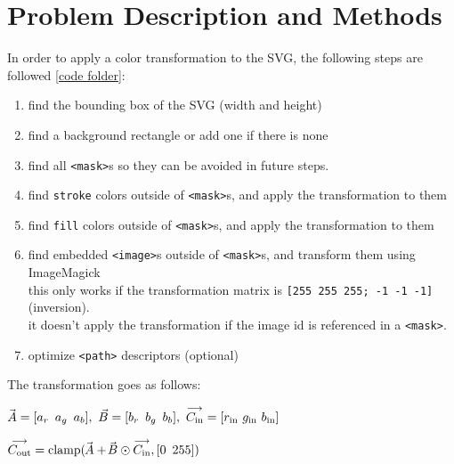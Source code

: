 \documentclass[12pt]{article}
\newcommand \hpx [1]{\hspace{#1px}}
\newcommand \nhpx [1]{\hspace{-#1px}}
\newcommand \Avec {\!\nhpx{-0.5}\vec{\hpx{0.5}A}}
\newcommand \Bvec {\nhpx{1.5}\vec{\hpx{0.3}B}}
\begin{document}
\section{Problem Description and Methods}

In order to apply a color transformation to the SVG, the following steps are followed
\ref{code folder}:
\begin{enumerate}
	\item \vspace{-0.3em} find the bounding box of the SVG (width and height)
	\item \vspace{-0.42em} find a background rectangle or add one if there is none
	\item \vspace{-0.42em} find all \texttt{<mask>}s so they can be avoided in
		future steps.
	\item \vspace{-0.42em} find {\tt stroke} colors outside of {\tt <mask>}s,
		and apply the transformation to them
	\item \vspace{-0.42em} find {\tt fill} colors outside of {\tt <mask>}s,
		and apply the transformation to them
	\item \vspace{-0.42em} find embedded {\tt <image>}s outside of {\tt <mask>}s,
		and transform them using ImageMagick\\
		this only works if the transformation matrix is {\tt [255 255 255; -1 -1 -1]}
		(inversion).\\
		it doesn't apply the transformation if the image id is referenced in a
		{\tt <mask>}.
	\item \vspace{-0.42em} optimize {\tt <path>} descriptors (optional)
\end{enumerate}

\pagebreak\restoregeometry

\noindent The transformation goes as follows:

$\Avec = [a_r ~\, a_g ~\, a_b],~\vec B = [b_r ~\, b_g ~\, b_b],~\overset{
\text{\raisebox{-0.5px}{$\longrightarrow$}}}{C_{\text{in}}} = [r_{\text{in}}
~ g_{\text{in}} ~ b_{\text{in}}]$

$\overset{\text{\raisebox{-0.5px}{$\longrightarrow$}}}{C_{\text{out}}} =
\text{clamp}(\Avec + \Bvec \odot
\overset{\text{\raisebox{-0.5px}{$\longrightarrow$}}}{C_{\text{in}}}, [0 ~\, 255])$
\end{document}

